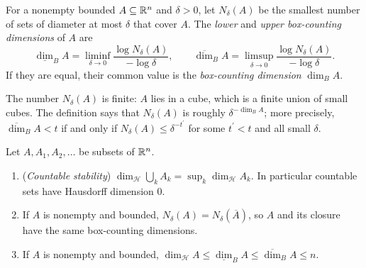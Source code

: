\begin{definition}\label{measure-theory:definition-box-dimension}
For a nonempty bounded $A \subseteq \mathbb{R}^n$ and $\delta > 0$, let $N_\delta(A)$ be the smallest number of sets of diameter at most $\delta$ that cover $A$. The \emph{lower} and \emph{upper box-counting
dimensions} of $A$ are
\[
\underline{\dim}_BA = \liminf_{\delta \to 0}\frac{\log N_\delta(A)}{-\log\delta}, \qquad \overline{\dim}_BA = \limsup_{\delta \to 0}\frac{\log N_\delta(A)}{-\log\delta}.
\]
If they are equal, their common value is the \emph{box-counting dimension} $\dim_BA$.
\end{definition}

The number $N_\delta(A)$ is finite: $A$ lies in a cube, which is a finite union of small cubes. The definition says that $N_\delta(A)$ is roughly $\delta^{-\dim_BA}$; more precisely,
$\overline{\dim}_BA < t$ if and only if $N_\delta(A) \leq \delta^{-t^{\prime}}$ for some $t^{\prime} < t$ and all small $\delta$.

\begin{proposition}\label{measure-theory:proposition-dimension-properties}
Let $A, A_1, A_2, \ldots$ be subsets of $\mathbb{R}^n$.
\begin{enumerate}
\item (\emph{Countable stability}) $\dim_{\mathcal{H}}\bigcup_kA_k = \sup_k\dim_{\mathcal{H}}A_k$. In particular countable sets have Hausdorff dimension $0$.
\item If $A$ is nonempty and bounded, $N_\delta(A) = N_\delta(\overline A)$, so $A$ and its closure have the same box-counting dimensions.
\item If $A$ is nonempty and bounded, $\dim_{\mathcal{H}}A \leq \underline{\dim}_BA \leq \overline{\dim}_BA \leq n$.
\end{enumerate}
\end{proposition}

